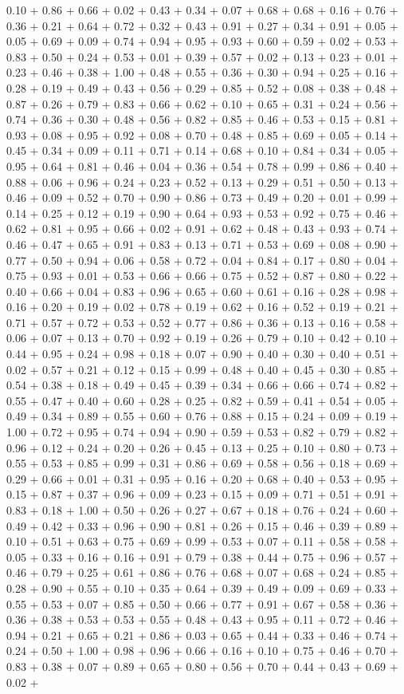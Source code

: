 \documentclass[preview]{standalone}
\begin{document}
\begin{center}
0.10 + 0.86 + 0.66 + 0.02 + 0.43 + 0.34 + 0.07 + 0.68 + 0.68 + 0.16 + 0.76 + 0.36 + 0.21 + 0.64 + 0.72 + 0.32 + 0.43 + 0.91 + 0.27 + 0.34 + 0.91 + 0.05 + 0.05 + 0.69 + 0.09 + 0.74 + 0.94 + 0.95 + 0.93 + 0.60 + 0.59 + 0.02 + 0.53 + 0.83 + 0.50 + 0.24 + 0.53 + 0.01 + 0.39 + 0.57 + 0.02 + 0.13 + 0.23 + 0.01 + 0.23 + 0.46 + 0.38 + 1.00 + 0.48 + 0.55 + 0.36 + 0.30 + 0.94 + 0.25 + 0.16 + 0.28 + 0.19 + 0.49 + 0.43 + 0.56 + 0.29 + 0.85 + 0.52 + 0.08 + 0.38 + 0.48 + 0.87 + 0.26 + 0.79 + 0.83 + 0.66 + 0.62 + 0.10 + 0.65 + 0.31 + 0.24 + 0.56 + 0.74 + 0.36 + 0.30 + 0.48 + 0.56 + 0.82 + 0.85 + 0.46 + 0.53 + 0.15 + 0.81 + 0.93 + 0.08 + 0.95 + 0.92 + 0.08 + 0.70 + 0.48 + 0.85 + 0.69 + 0.05 + 0.14 + 0.45 + 0.34 + 0.09 + 0.11 + 0.71 + 0.14 + 0.68 + 0.10 + 0.84 + 0.34 + 0.05 + 0.95 + 0.64 + 0.81 + 0.46 + 0.04 + 0.36 + 0.54 + 0.78 + 0.99 + 0.86 + 0.40 + 0.88 + 0.06 + 0.96 + 0.24 + 0.23 + 0.52 + 0.13 + 0.29 + 0.51 + 0.50 + 0.13 + 0.46 + 0.09 + 0.52 + 0.70 + 0.90 + 0.86 + 0.73 + 0.49 + 0.20 + 0.01 + 0.99 + 0.14 + 0.25 + 0.12 + 0.19 + 0.90 + 0.64 + 0.93 + 0.53 + 0.92 + 0.75 + 0.46 + 0.62 + 0.81 + 0.95 + 0.66 + 0.02 + 0.91 + 0.62 + 0.48 + 0.43 + 0.93 + 0.74 + 0.46 + 0.47 + 0.65 + 0.91 + 0.83 + 0.13 + 0.71 + 0.53 + 0.69 + 0.08 + 0.90 + 0.77 + 0.50 + 0.94 + 0.06 + 0.58 + 0.72 + 0.04 + 0.84 + 0.17 + 0.80 + 0.04 + 0.75 + 0.93 + 0.01 + 0.53 + 0.66 + 0.66 + 0.75 + 0.52 + 0.87 + 0.80 + 0.22 + 0.40 + 0.66 + 0.04 + 0.83 + 0.96 + 0.65 + 0.60 + 0.61 + 0.16 + 0.28 + 0.98 + 0.16 + 0.20 + 0.19 + 0.02 + 0.78 + 0.19 + 0.62 + 0.16 + 0.52 + 0.19 + 0.21 + 0.71 + 0.57 + 0.72 + 0.53 + 0.52 + 0.77 + 0.86 + 0.36 + 0.13 + 0.16 + 0.58 + 0.06 + 0.07 + 0.13 + 0.70 + 0.92 + 0.19 + 0.26 + 0.79 + 0.10 + 0.42 + 0.10 + 0.44 + 0.95 + 0.24 + 0.98 + 0.18 + 0.07 + 0.90 + 0.40 + 0.30 + 0.40 + 0.51 + 0.02 + 0.57 + 0.21 + 0.12 + 0.15 + 0.99 + 0.48 + 0.40 + 0.45 + 0.30 + 0.85 + 0.54 + 0.38 + 0.18 + 0.49 + 0.45 + 0.39 + 0.34 + 0.66 + 0.66 + 0.74 + 0.82 + 0.55 + 0.47 + 0.40 + 0.60 + 0.28 + 0.25 + 0.82 + 0.59 + 0.41 + 0.54 + 0.05 + 0.49 + 0.34 + 0.89 + 0.55 + 0.60 + 0.76 + 0.88 + 0.15 + 0.24 + 0.09 + 0.19 + 1.00 + 0.72 + 0.95 + 0.74 + 0.94 + 0.90 + 0.59 + 0.53 + 0.82 + 0.79 + 0.82 + 0.96 + 0.12 + 0.24 + 0.20 + 0.26 + 0.45 + 0.13 + 0.25 + 0.10 + 0.80 + 0.73 + 0.55 + 0.53 + 0.85 + 0.99 + 0.31 + 0.86 + 0.69 + 0.58 + 0.56 + 0.18 + 0.69 + 0.29 + 0.66 + 0.01 + 0.31 + 0.95 + 0.16 + 0.20 + 0.68 + 0.40 + 0.53 + 0.95 + 0.15 + 0.87 + 0.37 + 0.96 + 0.09 + 0.23 + 0.15 + 0.09 + 0.71 + 0.51 + 0.91 + 0.83 + 0.18 + 1.00 + 0.50 + 0.26 + 0.27 + 0.67 + 0.18 + 0.76 + 0.24 + 0.60 + 0.49 + 0.42 + 0.33 + 0.96 + 0.90 + 0.81 + 0.26 + 0.15 + 0.46 + 0.39 + 0.89 + 0.10 + 0.51 + 0.63 + 0.75 + 0.69 + 0.99 + 0.53 + 0.07 + 0.11 + 0.58 + 0.58 + 0.05 + 0.33 + 0.16 + 0.16 + 0.91 + 0.79 + 0.38 + 0.44 + 0.75 + 0.96 + 0.57 + 0.46 + 0.79 + 0.25 + 0.61 + 0.86 + 0.76 + 0.68 + 0.07 + 0.68 + 0.24 + 0.85 + 0.28 + 0.90 + 0.55 + 0.10 + 0.35 + 0.64 + 0.39 + 0.49 + 0.09 + 0.69 + 0.33 + 0.55 + 0.53 + 0.07 + 0.85 + 0.50 + 0.66 + 0.77 + 0.91 + 0.67 + 0.58 + 0.36 + 0.36 + 0.38 + 0.53 + 0.53 + 0.55 + 0.48 + 0.43 + 0.95 + 0.11 + 0.72 + 0.46 + 0.94 + 0.21 + 0.65 + 0.21 + 0.86 + 0.03 + 0.65 + 0.44 + 0.33 + 0.46 + 0.74 + 0.24 + 0.50 + 1.00 + 0.98 + 0.96 + 0.66 + 0.16 + 0.10 + 0.75 + 0.46 + 0.70 + 0.83 + 0.38 + 0.07 + 0.89 + 0.65 + 0.80 + 0.56 + 0.70 + 0.44 + 0.43 + 0.69 + 0.02 + 
\end{center}
\end{document}
